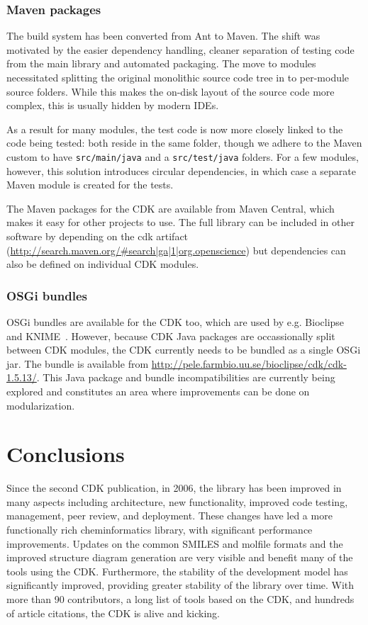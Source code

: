 \documentclass[10pt]{bmcart}
\begin{document}
\subsubsection*{Maven packages}

The build system has been converted from Ant to Maven. The shift was
motivated by the easier dependency handling, cleaner separation of
testing code from the main library and automated packaging. The move
to modules necessitated splitting the original monolithic source code
tree in to per-module source folders. While this makes the on-disk
layout of the source code more complex, this is usually hidden by
modern IDEs.

As a result for many modules, the test code is now more closely linked
to the code being tested: both reside in the same folder, though we
adhere to the Maven custom to have \texttt{src/main/java} and a
\texttt{src/test/java} folders.  For a few modules, however, this
solution introduces circular dependencies, in which case a separate
Maven module is created for the tests.

The Maven packages for the CDK are available from Maven Central, which makes it
easy for other projects to use. The full library can be included in other
software by depending on the cdk artifact (\url{http://search.maven.org/#search|ga|1|org.openscience})
but dependencies can also be defined on individual CDK modules.

\subsubsection*{OSGi bundles}

OSGi bundles are available for the CDK too, which are used by e.g.
Bioclipse~\cite{spjuth2007bioclipse,spjuth2009bioclipse} and
KNIME~\cite{Beisken2013}. However, because CDK Java packages are occassionally
split between CDK modules, the CDK currently needs to be bundled as a single
OSGi jar. The bundle is available from \url{http://pele.farmbio.uu.se/bioclipse/cdk/cdk-1.5.13/}.
This Java package and bundle incompatibilities are currently being explored and
constitutes an area where improvements can be done on modularization.



\section*{Conclusions}

Since the second CDK publication, in 2006, the library has been improved
in many aspects including architecture, new functionality, improved
code testing, management, peer review, and deployment. These changes have led a more
functionally rich cheminformatics library, with significant
performance improvements. Updates on the common SMILES and molfile
formats and the improved structure diagram generation are very visible
and benefit many of the tools using the CDK.  Furthermore, the
stability of the development model has significantly improved,
providing greater stability of the library over time.
With more than 90 contributors, a long list of tools based on the CDK, and
hundreds of article citations, the CDK is alive and kicking.
\end{document}
